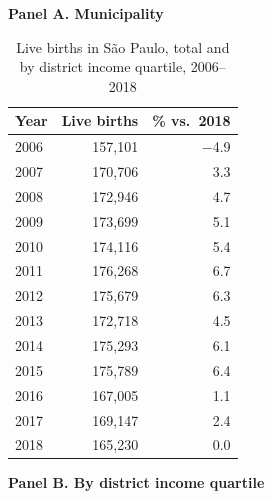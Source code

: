 \begin{table}[htbp]\centering
\caption{Live births in S\~ao Paulo, total and by district income quartile, 2006--2018}
\label{tab:S6a_nascidos_municipio}
\label{tab:S6b_nascidos_renda}
\footnotesize
\par\medskip\textbf{Panel A. Municipality}\par\smallskip
\begin{tabular}{lrr}
\toprule
Year & Live births & \% vs.\ 2018 \\
\midrule
2006 & 157,101 & $-$4.9 \\
2007 & 170,706 & 3.3 \\
2008 & 172,946 & 4.7 \\
2009 & 173,699 & 5.1 \\
2010 & 174,116 & 5.4 \\
2011 & 176,268 & 6.7 \\
2012 & 175,679 & 6.3 \\
2013 & 172,718 & 4.5 \\
2014 & 175,293 & 6.1 \\
2015 & 175,789 & 6.4 \\
2016 & 167,005 & 1.1 \\
2017 & 169,147 & 2.4 \\
2018 & 165,230 & 0.0 \\
\bottomrule
\end{tabular}
\par\medskip\textbf{Panel B. By district income quartile}\par\smallskip
{}
\end{table}
